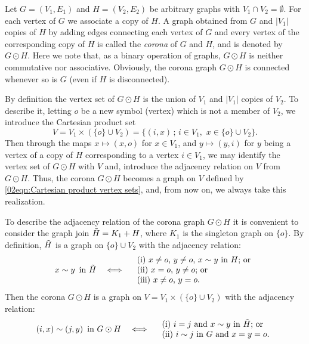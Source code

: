 \documentclass[12pt,a4paper]{article}
\newcommand{\1}{{\bm 1}}
\numberwithin{equation}{section}
\begin{document}
Let $G=(V_1,E_1)$ and $H=(V_2,E_2)$ be 
arbitrary graphs with $V_1\cap V_2=\emptyset$.
For each vertex of $G$ we associate a copy of $H$.
A graph obtained from $G$ and $|V_1|$ copies of $H$
by adding edges connecting
each vertex of $G$ and every vertex of the corresponding copy of $H$
is called the \textit{corona} of $G$ and $H$,
and is denoted by $G\odot H$.
Here we note that, as a binary operation of graphs,
$G\odot H$ is neither commutative nor associative.
Obviously, the corona graph $G\odot H$ is connected
whenever so is $G$ (even if $H$ is disconnected).

By definition the vertex set of $G\odot H$ 
is the union of $V_1$ and $|V_1|$ copies of $V_2$.
To describe it, letting $o$ be a new symbol (vertex)
which is not a member of $V_2$, we introduce
the Cartesian product set
%
\begin{equation}\label{02eqn:Cartesian product vertex sets}
V=V_1\times (\{o\}\cup V_2)
=\{(i,x)\,;\, i\in V_1,\,\, x\in \{o\}\cup V_2\}.
\end{equation}
%
Then through the maps $x\mapsto (x,o)$ for $x\in V_1$, and
$y\mapsto (y,i)$ for $y$ being a vertex of a copy of $H$
corresponding to a vertex $i\in V_1$,
we may identify the vertex set of $G\odot H$ with $V$
and, introduce the adjacency relation on $V$ from $G\odot H$.
Thus, the corona $G\odot H$ becomes a graph
on $V$ defined by \eqref{02eqn:Cartesian product vertex sets},
and, from now on, we always take this realization. 

To describe the adjacency relation of the corona graph $G\odot H$
it is convenient to consider the graph join $\Tilde{H}=K_1+H$,
where $K_1$ is the singleton graph on $\{o\}$.
By definition, $\Tilde{H}$ is a graph on $\{o\}\cup V_2$ with
the adjacency relation:
\[
x\sim y \,\,\,\text{in $\Tilde{H}$}
\quad\Longleftrightarrow\quad
\begin{array}{l}
\text{(i) $x\neq o$, $y\neq o$, $x\sim y$ in $H$; or} \\
\text{(ii) $x=o$, $y\neq o$; or} \\
\text{(iii) $x\neq o$, $y=o$}.
\end{array}
\]
Then the corona $G\odot H$ is a graph on
$V=V_1\times (\{o\}\cup V_2)$ 
with the adjacency relation:
\[
(i,x)\sim (j,y)  \,\,\,\text{in $G\odot H$}
\quad\Longleftrightarrow\quad
\begin{array}{l}
\text{(i) $i=j$ and $x\sim y$ in $\Tilde{H}$; or} \\
\text{(ii) $i\sim j$ in $G$ and $x=y=o$}.
\end{array}
\]
\end{document}
